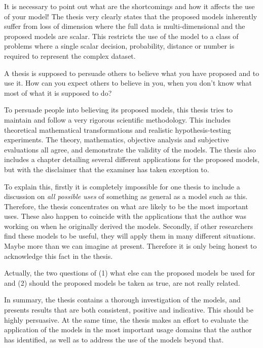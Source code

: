 \replyToComment
    {
      It is necessary to point out what are the shortcomings and how it affects the use of your model!
    }
    {
      The thesis very clearly states %
       that the proposed models inherently suffer from loss of dimension where the full data is multi-dimensional and the proposed models are scalar.
      This restricts the use of the model to a class of problems where a single scalar decision, probability, distance or number is required to represent the complex dataset.
    }

\replyToComment
    {
      A thesis is supposed to persuade others to believe what you have proposed and to use it.
      How can you expect others to believe in you, when you don't know what most of what it is supposed to do?
    }
    {
     To persuade people into believing its proposed models, this thesis tries to maintain and follow a very rigorous scientific methodology. 
     This includes theoretical mathematical transformations and realistic hypothesis-testing experiments.
     The theory, mathematics, objective analysis and subjective evaluations all agree, and demonstrate the validity of the models.
      The thesis also includes a chapter detailing several different applications for the proposed models, but with the disclaimer that the examiner has taken exception to.
      
      To explain this, firstly it is completely impossible for one thesis to include a discussion on \textit{all possible uses} of something as general as a model such as this. Therefore, the thesis concentrates on what are likely to be the most important uses. These also happen to coincide with the applications that the author was working on when he originally derived the models.
      Secondly, if other researchers find these models to be useful, they will apply them in many different situations. Maybe more than we can imagine at present. Therefore it is only being honest to acknowledge this fact in the thesis.

Actually, the two questions of (1) what else can the proposed models be used for and (2) should the proposed models be taken as true, are not really related.

In summary, the thesis contains a thorough investigation of the models, and presents results that are both consistent, positive and indicative. This should be highly persuasive.
At the same time, the thesis makes an effort to evaluate the application of the models in the most important usage domains that the author has identified, as well as to address the use of the models beyond that.
    }

